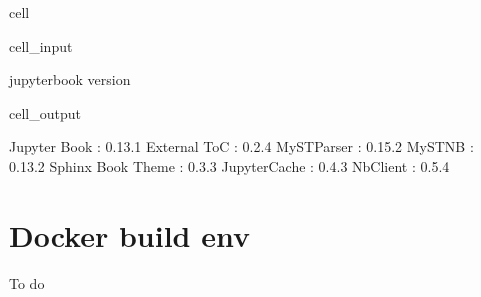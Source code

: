 \documentclass[letterpaper,table,10pt,english]{jupyterBook}
\begin{document}
\begin{sphinxuseclass}{cell}\begin{sphinxVerbatimInput}

\begin{sphinxuseclass}{cell_input}
\begin{sphinxVerbatim}[commandchars=\\\{\}]
jupyter\PYGZhy{}book \PYGZhy{}\PYGZhy{}version
\end{sphinxVerbatim}

\end{sphinxuseclass}\end{sphinxVerbatimInput}
\begin{sphinxVerbatimOutput}

\begin{sphinxuseclass}{cell_output}
\begin{sphinxVerbatim}[commandchars=\\\{\}]
Jupyter Book      : 0.13.1
External ToC      : 0.2.4
MyST\PYGZhy{}Parser       : 0.15.2
MyST\PYGZhy{}NB           : 0.13.2
Sphinx Book Theme : 0.3.3
Jupyter\PYGZhy{}Cache     : 0.4.3
NbClient          : 0.5.4
\end{sphinxVerbatim}

\end{sphinxuseclass}\end{sphinxVerbatimOutput}

\end{sphinxuseclass}

\section{Docker build env}
\label{\detokenize{tests/build_versions_checks:docker-build-env}}
\sphinxAtStartPar
To do
\end{document}
